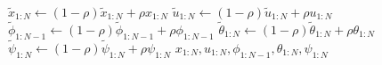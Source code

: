 \documentclass[letterpaper,11pt]{article}
\newcommand{\tlx}{\tilde{x}}
\newcommand{\tlu}{\tilde{u}}
\newcommand{\tlphi}{\tilde{\phi}}
\newcommand{\tltheta}{\tilde{\theta}}
\newcommand{\tlpsi}{\tilde{\psi}}
\newcommand{\ssb}[1]{{\scriptscriptstyle #1}}
\begin{document}
\begin{algorithm}[!htpb]
\begin{algorithmic}[1]
            \State $\tlx_\ssb{1:N} \gets (1-\rho)\tlx_\ssb{1:N} + \rho x_\ssb{1:N}$
            \State $\tlu_\ssb{1:N} \gets (1-\rho)\tlu_\ssb{1:N} + \rho u_\ssb{1:N}$
            \State $\tlphi_\ssb{1:N-1} \gets (1-\rho)\tlphi_\ssb{1:N-1} + \rho \phi_\ssb{1:N-1}$
            \State $\tltheta_\ssb{1:N} \gets (1-\rho)\tltheta_\ssb{1:N} + \rho \theta_\ssb{1:N}$
            \State $\tlpsi_\ssb{1:N} \gets (1-\rho)\tlpsi_\ssb{1:N} + \rho \psi_\ssb{1:N}$
        \EndFor
        \Ensure $x_\ssb{1:N},u_\ssb{1:N},\phi_\ssb{1:N-1},\theta_\ssb{1:N},\psi_\ssb{1:N}$
    \end{algorithmic}
\end{algorithm}



\end{document}
